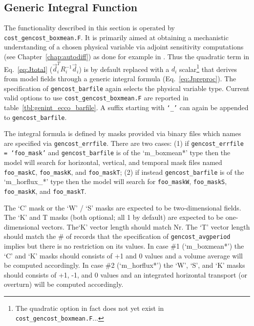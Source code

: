 \clearpage

\subsection{Generic Integral Function} \label{intgen}

The functionality described in this section is operated by \texttt{cost\_gencost\_boxmean.F}. It is primarily aimed at obtaining a mechanistic understanding of a chosen physical variable via adjoint sensitivity computations (see Chapter~\ref{chap:autodiff}) as done for example in \cite{maro-eta:99,heim-eta:11,fuku-etal:14}. Thus the quadratic term in Eq.~\ref{eq:Jtotal} ($\vec{d}_i^T R_i^{-1} \vec{d}_i$) is by default replaced with a $d_i$ scalar\footnote{The quadratic option in fact does not yet exist in \texttt{cost\_gencost\_boxmean.F}...} that derives from model fields through a generic integral formula (Eq.~\ref{eq:Jpreproc}). The specification of \texttt{gencost\_barfile} again selects the physical variable type. Current valid options to use \texttt{cost\_gencost\_boxmean.F} are reported in table~\ref{tbl:genint_ecco_barfile}. A suffix starting with \texttt{`\_'} can again be appended to \texttt{gencost\_barfile}.

The integral formula is defined by masks provided via binary files which names are specified via \texttt{gencost\_errfile}. There are two cases: (1) if \texttt{gencost\_errfile = `foo\_mask'} and \texttt{gencost\_barfile} is of the `m\_boxmean*' type then the model will search for horizontal, vertical, and temporal mask files  named \texttt{foo\_maskC}, \texttt{foo\_maskK}, and \texttt{foo\_maskT}; (2) if instead \texttt{gencost\_barfile} is of the `m\_horflux\_*' type then the model will search for \texttt{foo\_maskW}, \texttt{foo\_maskS}, \texttt{foo\_maskK}, and \texttt{foo\_maskT}. 

The `C' mask or the `W' / `S' masks are expected to be two-dimensional fields. The `K' and T masks (both optional; all 1 by default) are expected to be one-dimensional vectors. The`K' vector length should match Nr. The `T' vector length should match the \# of records that the specification of \texttt{gencost\_avgperiod} implies but there is no restriction on its values. In case \#1 (`m\_boxmean*') the `C' and `K' masks should consists of +1 and 0 values and a volume average will be computed accordingly. In case \#2 (`m\_horflux*') the `W', `S', and `K' masks should consists of +1, -1, and 0 values and an integrated horizontal transport (or overturn) will be computed accordingly. 

